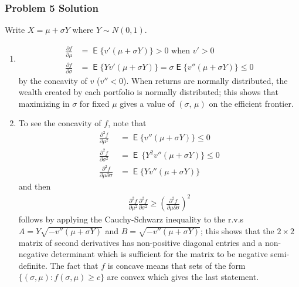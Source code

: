 \documentclass[10pt,handout]{beamer}
\DeclareMathOperator\expc{\mathsf{E}}
\theoremstyle{definition}
\begin{document}
\begin{frame}[allowframebreaks]
  \frametitle{Problem 5 Solution}
  Write $X = \mu + \sigma Y$ where $Y\sim N(0,1)$. 
  \begin{enumerate}
    \item 
      \begin{align*}
        \frac{\partial f}{\partial \mu} &= \expc\{v'(\mu + \sigma Y)\} > 0 \text{ when } v' > 0 \\
        \frac{\partial f}{\partial\sigma} &= \expc\{Yv'(\mu + \sigma Y)\} = \sigma \expc\{v''(\mu + \sigma Y)\} \leqslant 0
      \end{align*}
      by the concavity of $v$ ($v'' < 0$). When returns are normally distributed, the wealth created by each portfolio is normally distributed; this shows that maximizing in $\sigma$ for fixed $\mu$ gives a value of $(\sigma,\,\mu)$ on the efficient frontier.
    \item To see the concavity of $f$, note that
      \begin{align*}
        \frac{\partial^2 f}{\partial \mu^2} &= \expc\{v''(\mu + \sigma Y)\} \leqslant 0 \\
        \frac{\partial^2 f}{\partial \sigma^2} &= \expc\,\{Y^2v''(\mu + \sigma Y)\} \leqslant 0 \\
        \frac{\partial^2 f}{\partial \mu \partial \sigma} &= \expc\{Yv''(\mu + \sigma Y)\}
      \end{align*}
      and then
      \begin{align*}
        \frac{\partial^2 f}{\partial \mu^2}\frac{\partial^2 f}{\partial \sigma^2} \geqslant \left(\frac{\partial^2 f}{\partial \mu \partial \sigma}\right)^2
      \end{align*}
      follows by applying the Cauchy-Schwarz inequality to the r.v.s $A = Y\sqrt{-v''(\mu + \sigma Y)}$ and $B = \sqrt{-v''(\mu + \sigma Y)}$; this shows that the $2 \times 2$ matrix of second derivatives has non-positive diagonal entries and a non-negative determinant which is sufficient for the matrix to be negative semi-definite. The fact that $f$ is concave means that sets of the form $\{(\sigma,\mu) : f(\sigma,\mu) \geqslant c\}$ are convex which gives the last statement.
  \end{enumerate}
\end{frame}
\end{document}
